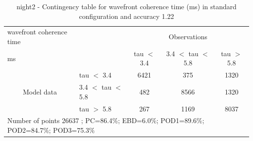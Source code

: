 \begin{table}[p!]
\begin{center}
\begin{tabular}{llccc}
\hline
{wavefront coherence time}                                       &                                                    & \multicolumn{3}{c}{Observations}                 \\
{ms}                                       &                             & tau $<$ 3.4   & 3.4 $<$ tau $<$ 5.8 & tau $>$ 5.8 \\
\hline
\multicolumn{1}{c}{\multirow{3}{*}{Model data}}  & tau $<$ 3.4             & 6421                & 375                       & 1320              \\
                                                 & 3.4  $<$ tau $<$ 5.8 & 482                & 8566                       & 1320              \\
                                                 & tau $>$ 5.8             & 267                & 1169                       & 8037              \\
\hline
\multicolumn{5}{l}{ Number of points        26637 ; PC=86.4\%; EBD=6.0\%; POD1=89.6\%; POD2=84.7\%; POD3=75.3\%}
\end{tabular}
\end{center}
\caption{night2 - Contingency table for  wavefront coherence time (ms) in standard configuration and accuracy 1.22}
\label{tab:contingencytauBEF:night2}
\end{table}
